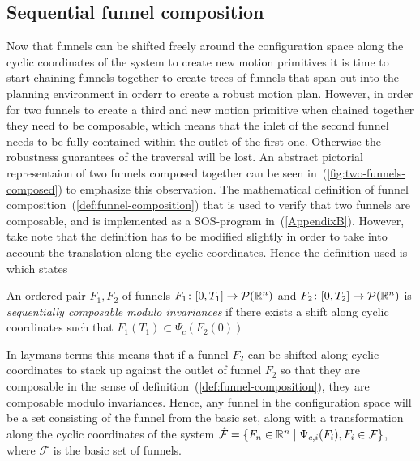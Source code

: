 \subsection{Sequential funnel composition}
\label{sec:composable-funnels}

Now that funnels can be shifted freely around the configuration space along the
cyclic coordinates of the system to create new motion primitives it is time to
start chaining funnels together to create trees of funnels that span out into
the planning environment in orderr to create a robust motion plan. However, in
order for two funnels to create a third and new motion primitive when chained
together they need to be composable, which means that the inlet of the second
funnel needs to be fully contained within the outlet of the first one. Otherwise
the robustness guarantees of the traversal will be lost. An abstract pictorial
representaion of two funnels composed together can be seen
in~(\ref{fig:two-funnels-composed}) to emphasize this observation. The
mathematical definition of funnel composition~(\ref{def:funnel-composition})
that is used to verify that two funnels are composable, and is implemented as a
\ac{SOS}-program in~(\ref{AppendixB}). However, take note that the definition
has to be modified slightly in order to take into account the translation along
the cyclic coordinates. Hence the definition used
is~\cite[definition~3,sec~5]{majumdarFunnelLibrariesRealtime2017} which states
\begin{definition}
  An ordered pair \(F_1,F_2\) of funnels \(F_1 \colon [0,T_1] \rightarrow
  \mathcal{P}(\mathbb{R}^n)\) and \(F_2 \colon [0,T_2] \rightarrow \mathcal{P}(\mathbb{R}^n)\)
  is \textit{sequentially composable modulo invariances} if there exists a shift
  along cyclic coordinates such that \(F_{1}(T_1) \subset
  \Psi_{c}\left(F_2(0)\right)\)
\end{definition}
In laymans terms this means that if a funnel \(F_2\) can be shifted along cyclic
coordinates to stack up against the outlet of funnel \(F_2\) so that they are
composable in the sense of definition~(\ref{def:funnel-composition}), they are
composable modulo invariances. Hence, any funnel in the configuration space will
be a set consisting of the funnel from the basic set, along with a
transformation along the cyclic coordinates of the system \(\hat{\mathcal{F}} =
\lbrace F_n \in \mathbb{R}^n \mid \Psi_{c,i}(F_i), F_i \in \mathcal{F}\rbrace\), where
\(\mathcal{F}\) is the basic set of funnels.

